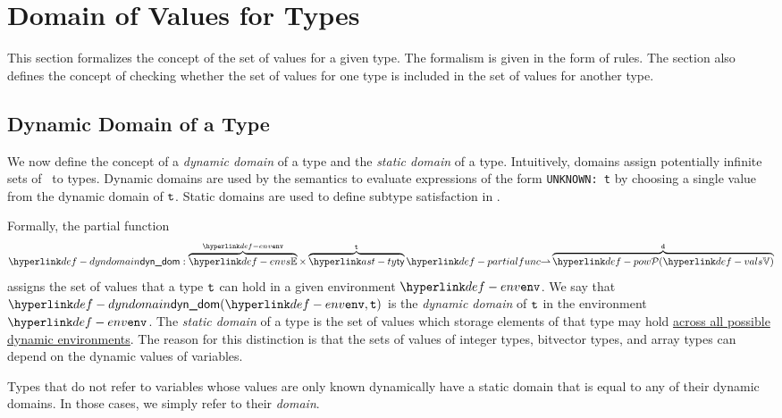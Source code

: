 \section{Domain of Values for Types\label{sec:DomainOfValuesForTypes}}
This section formalizes the concept of the set of values for a given type.
The formalism is given in the form of rules.
%
The section also defines the concept of checking whether the set of values
for one type is included in the set of values for another type.

\subsection{Dynamic Domain of a Type\label{sec:DynDomain}}
\hypertarget{def-dyndomain}{}

We now define the concept of a \emph{dynamic domain} of a type
and the \emph{static domain} of a type.
Intuitively, domains assign potentially infinite sets of \nativevalues\ to types.
Dynamic domains are used by the semantics to evaluate expressions of the form \texttt{UNKNOWN: t}
by choosing a single value from the dynamic domain of $\texttt{t}$.
Static domains are used to define subtype satisfaction in .

Formally, the partial function
\[
  \dynamicdomain : \overname{\envs}{\env} \times \overname{\ty}{\vt}
  \partialto \overname{\pow{\vals}}{\vd}
\]
assigns the set of values that a type $\texttt{t}$ can hold in a given environment $\env$.
%
We say that $\dynamicdomain(\env, \vt)$ is the \emph{dynamic domain} of $\texttt{t}$
in the environment $\env$.
%
The \emph{static domain} of a type is the set of values which storage elements of that type may hold
\underline{across all possible dynamic environments}.
%
The reason for this distinction is that the sets of values
of integer types, bitvector types, and array types can depend on the dynamic values of variables.

Types that do not refer to variables whose values are only known dynamically have
a static domain that is equal to any of their dynamic domains.
In those cases, we simply refer to their \emph{domain}.

